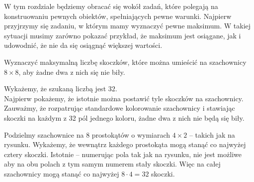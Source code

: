 % 


\noindent
W tym rozdziale będziemy obracać się wokół zadań, które polegają na konstruowaniu pewnych obiektów, spełniających pewne warunki. Najpierw przyjrzymy się zadaniu, w którym mamy wyznaczyć pewne maksimum. W takiej sytuacji musimy zarówno pokazać przykład, że maksimum jest osiągane, jak i udowodnić, że nie da się osiągnąć większej wartości.

\vspace{10px}


\noindent
Wyznaczyć maksymalną liczbę skoczków, które można umieścić na szachownicy $8\times8$, aby żadne dwa z nich się nie biły.


\noindent
Wykażemy, że szukaną liczbą jest $32$.\\
Najpierw pokażemy, że istotnie można postawić tyle skoczków na szachownicy. Zauważmy, że rozpatrując standardowe kolorowanie szachownicy i stawiając skoczki na każdym z 32 pól jednego koloru, żadne dwa z nich nie będą się biły.

\begin{center}
\end{center}

\noindent
Podzielmy szachownice na $8$ prostokątów o wymiarach $4\times2$ -- takich jak na rysunku. Wykażemy, że wewnątrz każdego prostokąta mogą stanąć co najwyżej cztery skoczki. Istotnie – numerując pola tak jak na rysunku, nie jest możliwe aby na obu polach z tym samym numerem stały skoczki. Więc na całej szachownicy mogą stanąć co najwyżej $8 \cdot 4 = 32$ skoczki.

